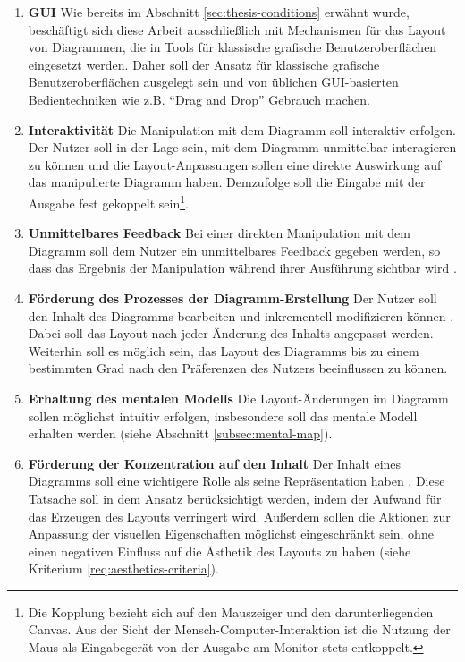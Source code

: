 \begin{enumerate}[label={K.\arabic*}]
    \item \label{req:gui} \textbf{GUI} Wie bereits im Abschnitt \ref{sec:thesis-conditions} erwähnt wurde, beschäftigt sich diese Arbeit ausschließlich mit Mechanismen für das Layout von Diagrammen, die in Tools für klassische grafische Benutzeroberflächen eingesetzt werden. Daher soll der Ansatz für klassische grafische Benutzeroberflächen ausgelegt sein und von üblichen GUI-basierten Bedientechniken wie z.B. \enquote{Drag and Drop} Gebrauch machen.
    \item \label{req:interactivity} \textbf{Interaktivität} Die Manipulation mit dem Diagramm soll interaktiv erfolgen. Der Nutzer soll in der Lage sein, mit dem Diagramm unmittelbar interagieren zu können und die Layout-Anpassungen sollen eine direkte Auswirkung auf das manipulierte Diagramm haben. Demzufolge soll die Eingabe mit der Ausgabe fest gekoppelt sein\footnote{Die Kopplung bezieht sich auf den Mauszeiger und den darunterliegenden Canvas. Aus der Sicht der Mensch-Computer-Interaktion ist die Nutzung der Maus als Eingabegerät von der Ausgabe am Monitor stets entkoppelt.}.
    \item \label{req:immediate-feedback} \textbf{Unmittelbares Feedback} Bei einer direkten Manipulation mit dem Diagramm soll dem Nutzer ein unmittelbares Feedback gegeben werden, so dass das Ergebnis der Manipulation während ihrer Ausführung sichtbar wird \cite[S.69]{Wybrow08Using}.
    \item \label{req:editing-support} \textbf{Förderung des Prozesses der Diagramm-Erstellung} Der Nutzer soll den Inhalt des Diagramms bearbeiten und inkrementell modifizieren können \cite{GladischSchumann14Semi-Automatic}. Dabei soll das Layout nach jeder Änderung des Inhalts angepasst werden. Weiterhin soll es möglich sein, das Layout des Diagramms bis zu einem bestimmten Grad nach den Präferenzen des Nutzers beeinflussen zu können.
    \item \label{req:mental-map} \textbf{Erhaltung des mentalen Modells} Die Layout-Änderungen im Diagramm sollen möglichst intuitiv erfolgen, insbesondere soll das mentale Modell erhalten werden (siehe Abschnitt \ref{subsec:mental-map}).
    \item \label{req:focus-on-the-content} \textbf{Förderung der Konzentration auf den Inhalt} Der Inhalt eines Diagramms soll eine wichtigere Rolle als seine Repräsentation haben \cite[S.38ff]{Ambler02Agile}. Diese Tatsache soll in dem Ansatz berücksichtigt werden, indem der Aufwand für das Erzeugen des Layouts verringert wird. Außerdem sollen die Aktionen zur Anpassung der visuellen Eigenschaften möglichst eingeschränkt sein, ohne einen negativen Einfluss auf die Ästhetik des Layouts zu haben (siehe Kriterium \ref{req:aesthetics-criteria}).

\end{enumerate}

